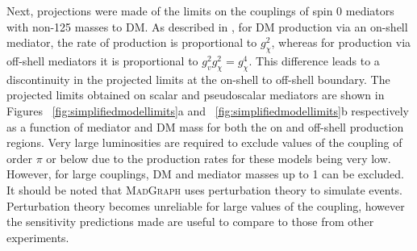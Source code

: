 Next, projections were made of the limits on the couplings of spin 0 mediators with non-125 \GeV masses to \ac{DM}. As described in , for \ac{DM} production via an on-shell mediator, the rate of production is proportional to $g_{\chi}^{2}$, whereas for production via off-shell mediators it is proportional to $g_{v}^{2}g_{\chi}^{2}=g_{\chi}^{4}$. This difference leads to a discontinuity in the projected limits at the on-shell to off-shell boundary. The projected limits obtained on scalar and pseudoscalar mediators are shown in Figures ~\ref{fig:simplifiedmodellimits}a and ~\ref{fig:simplifiedmodellimits}b respectively as a function of mediator and \ac{DM} mass for both the on and off-shell production regions. Very large luminosities are required to exclude values of the coupling of order $\pi$ or below due to the production rates for these models being very low. However, for large couplings, \ac{DM} and mediator masses up to 1 \TeV can be excluded. It should be noted that \textsc{MadGraph} uses perturbation theory to simulate events. Perturbation theory becomes unreliable for large values of the coupling, however the sensitivity predictions made are useful to compare to those from other experiments.

